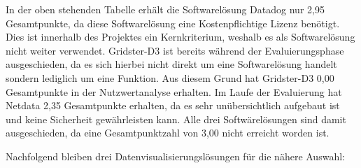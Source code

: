 \begin{table}[H]
\caption{Nutzwertanalyse Datadog, Gridster-D3 und Netdata}
\label{nwa_dgn}
\end{table}

In der oben stehenden Tabelle erhält die Softwarelösung Datadog nur 2,95
Gesamtpunkte, da diese Softwarelösung eine Kostenpflichtige Lizenz benötigt.
Dies ist innerhalb des Projektes ein Kernkriterium, weshalb es als
Softwarelösung nicht weiter verwendet. Gridster\hyp{}D3 ist bereits während der
Evaluierungsphase ausgeschieden, da es sich hierbei nicht direkt um eine
Softwarelösung handelt sondern lediglich um eine Funktion. Aus diesem Grund
hat Gridster\hyp{}D3 0,00 Gesamtpunkte in der Nutzwertanalyse erhalten. Im Laufe der
Evaluierung hat Netdata 2,35 Gesamtpunkte erhalten, da es sehr unübersichtlich
aufgebaut ist und keine Sicherheit gewährleisten kann. Alle drei
Softwärelösungen sind damit ausgeschieden, da eine Gesamtpunktzahl von 3,00
nicht erreicht worden ist.

Nachfolgend bleiben drei Datenvisualisierungslösungen für die nähere Auswahl:

